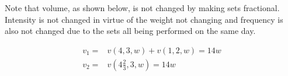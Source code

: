 Note that volume, as shown below, is not changed by making sets fractional. Intensity is not changed in virtue of the weight not changing and frequency is also not changed due to the sets all being performed on the same day.

\begin{equation*}
    \begin{split}
        v_1=&v(4,3,w)+v(1,2,w)=14w \\
        v_2=&v\left(4\frac{2}{3},3,w\right)=14w \\
    \end{split}
\end{equation*}